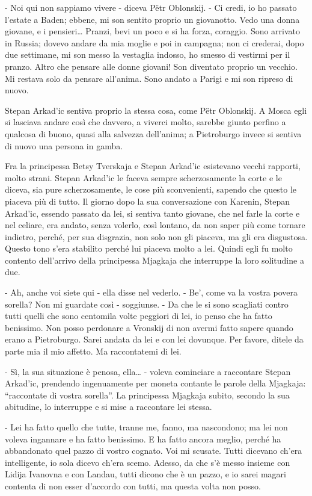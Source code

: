 - Noi qui non sappiamo vivere - diceva Pëtr Oblonskij. - Ci credi, io ho passato l'estate a Baden; ebbene, mi son sentito proprio un giovanotto. Vedo una donna giovane, e i pensieri\ldots{} Pranzi, bevi un poco e si ha forza, coraggio. Sono arrivato in Russia; dovevo andare da mia moglie e poi in campagna; non ci crederai, dopo due settimane, mi son messo la vestaglia indosso, ho smesso di vestirmi per il pranzo. Altro che pensare alle donne giovani! Son diventato proprio un vecchio. Mi restava solo da pensare all'anima. Sono andato a Parigi e mi son ripreso di nuovo. 

Stepan Arkad'ic sentiva proprio la stessa cosa, come Pëtr Oblonskij. A Mosca egli si lasciava andare così che davvero, a viverci molto, sarebbe giunto perfino a qualcosa di buono, quasi alla salvezza dell'anima; a Pietroburgo invece si sentiva di nuovo una persona in gamba. 

Fra la principessa Betsy Tverskaja e Stepan Arkad'ic esistevano vecchi rapporti, molto strani. Stepan Arkad'ic le faceva sempre scherzosamente la corte e le diceva, sia pure scherzosamente, le cose più sconvenienti, sapendo che questo le piaceva più di tutto. Il giorno dopo la sua conversazione con Karenin, Stepan Arkad'ic, essendo passato da lei, si sentiva tanto giovane, che nel farle la corte e nel celiare, era andato, senza volerlo, così lontano, da non saper più come tornare indietro, perché, per sua disgrazia, non solo non gli piaceva, ma gli era disgustosa. Questo tono s'era stabilito perché lui piaceva molto a lei. Quindi egli fu molto contento dell'arrivo della principessa Mjagkaja che interruppe la loro solitudine a due. 

- Ah, anche voi siete qui - ella disse nel vederlo. - Be', come va la vostra povera sorella? Non mi guardate così - soggiunse. - Da che le si sono scagliati contro tutti quelli che sono centomila volte peggiori di lei, io penso che ha fatto benissimo. Non posso perdonare a Vronskij di non avermi fatto sapere quando erano a Pietroburgo. Sarei andata da lei e con lei dovunque. Per favore, ditele da parte mia il mio affetto. Ma raccontatemi di lei. 

- Sì, la sua situazione è penosa, ella\ldots{} - voleva cominciare a raccontare Stepan Arkad'ic, prendendo ingenuamente per moneta contante le parole della Mjagkaja: ``raccontate di vostra sorella''. La principessa Mjagkaja subito, secondo la sua abitudine, lo interruppe e si mise a raccontare lei stessa. 

- Lei ha fatto quello che tutte, tranne me, fanno, ma nascondono; ma lei non voleva ingannare e ha fatto benissimo. E ha fatto ancora meglio, perché ha abbandonato quel pazzo di vostro cognato. Voi mi scusate. Tutti dicevano ch'era intelligente, io sola dicevo ch'era scemo. Adesso, da che s'è messo insieme con Lidija Ivanovna e con Landau, tutti dicono che è un pazzo, e io sarei magari contenta di non esser d'accordo con tutti, ma questa volta non posso. 

